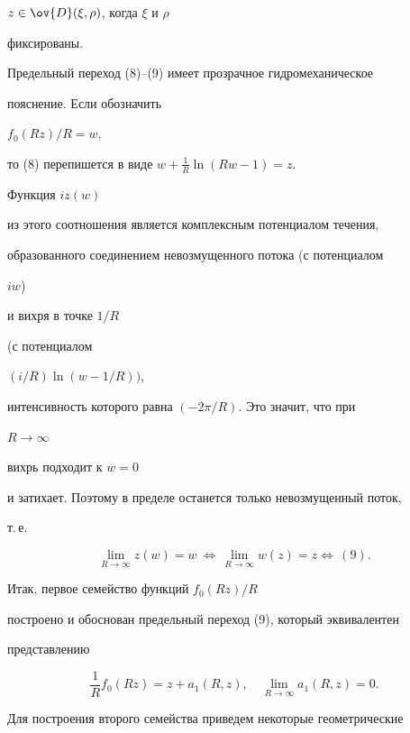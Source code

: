 \begin{pf}
$z\in \ov{D}(\xi,\rho)$, когда $\xi$ и $\rho$ 


фиксированы. 


 


Предельный переход (8)--(9) имеет прозрачное гидромеханическое 


пояснение. Если обозначить 


$f_0 (Rz)/R=w$, 


то (8) перепишется в виде $w+\frac{1}{R}\ln(Rw-1)=z$. 


Функция $iz(w)$ 


из этого соотношения является комплексным потенциалом течения, 


образованного соединением невозмущенного потока (с потенциалом 


$iw$) 


и вихря в точке $1/R$ 


(с потенциалом 


$(i/R)\ln(w-1/R))$, 


интенсивность которого равна $(-2\pi/R)$. Это значит, что при 


$R\to\infty$ 


вихрь подходит к $w=0$ 


и затихает. Поэтому в пределе останется только невозмущенный поток, 


т.\,е. 


$$ 


\lim_{R\to\infty}z(w)=w\ \Longleftrightarrow \, 


\lim_{R\to\infty}w(z)=z \Longleftrightarrow \, 


(9). 


$$ 


 


Итак, первое семейство функций $f_0(Rz)/R$ 


построено и обоснован предельный переход (9), который эквивалентен 


представлению 


\begin{equation} 


\frac{1}{R}f_0(Rz)=z+a_1(R,z),\quad 


\lim_{R\to\infty}a_1(R,z)=0. 


\end{equation} 





Для построения второго семейства приведем некоторые геометрические 



\end{pf}
